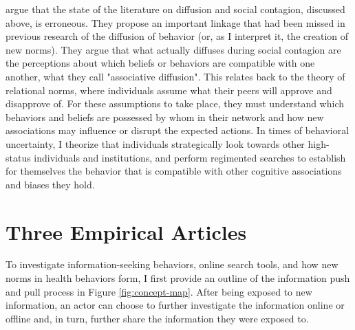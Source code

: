 \citet{goldbergSocialContagionAssociative2018} argue that the state of the
literature on diffusion and social contagion, discussed above, is erroneous.
They propose an important linkage that had been missed in previous research of
the diffusion of behavior (or, as I interpret it, the creation of new norms).
They argue that what actually diffuses during social contagion are the
perceptions about which beliefs or behaviors are compatible with one another,
what they call "associative diffusion". 
This relates back to the theory of relational norms, where individuals assume
what their peers will approve and disapprove of. For these assumptions 
to take place, they must understand which behaviors and beliefs
are possessed by whom in their network and how new associations may influence
or disrupt the expected actions. In times of behavioral uncertainty, I
theorize that individuals strategically look towards other high-status
individuals and institutions, and perform regimented searches to establish for
themselves the behavior that is compatible with other cognitive associations
and biases they hold.

\section{Three Empirical Articles}

To investigate information-seeking behaviors, online search tools, and how
new norms in health behaviors form, I first provide an outline of the 
information push and pull process in Figure \ref{fig:concept-map}. After 
being exposed to new information, an actor can choose to further investigate
the information online or offline and, in turn, further share the 
information they were exposed to. 

